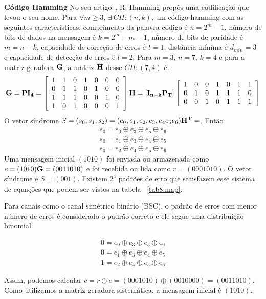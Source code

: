 \begin{example} {\bf Código Hamming} \label{CodHamm} 
No seu artigo~\cite{Hamming:1950}, R. Hamming propôs uma codificação que levou o seu nome. Para $\forall m \geq 3$, $\exists\ CH:(n,k)$, um código hamming com as seguintes características: comprimento da palavra código é $n=2^m -1$, número de bits de dados na mensagem é $k=2^m-m-1$, número de bits de paridade é $m=n-k$, capacidade de correção de erros é $t=1$, distância mínima é $d_{min} = 3$ e capacidade de detecção de erros é $l=2$. Para $m=3$, $n=7$, $k=4$ e para a matriz geradora ${\bf G}$, a matriz ${\bf H}$ desse $CH:(7,4)$ é:
\begin{align*}
{\bf G} = {\bf PI_4} = \left[\begin{array}{ccccccc}
1 & 1 & 0 & 1 & 0 & 0 & 0\\
0 & 1 & 1 & 0 & 1 & 0 & 0\\
1 & 1 & 1 & 0 & 0 & 1 & 0\\
1 & 0 & 1 & 0 & 0 & 0 & 1
\end{array}\right]
{\bf H} = \left[ {\bf I_{n-k}P_T} \right] \left[\begin{array}{ccccccc}
1 & 0 & 0 & 1 & 0 & 1 & 1\\
0 & 1 & 0 & 1 & 1 & 1 & 0\\
0 & 0 & 1 & 0 & 1 & 1 & 1
\end{array}\right]
\end{align*}
O vetor síndrome $S=(s_0, s_1, s_2)= (e_0, e_1, e_2, e_3, e_4 e_5 e_6){\bf H^T}=$. Então
\begin{align*}
s_0=e_0 \oplus e_3 \oplus e_5 \oplus e_6\\
s_0=e_1 \oplus e_3 \oplus e_4 \oplus e_5\\
s_0=e_2 \oplus e_4 \oplus e_5 \oplus e_6
\end{align*}
Uma mensagem inicial $(1010)$ foi enviada ou armazenada como $c=(1010){\bf G}=(0011010)$ e foi recebida ou lida como $r=(0001010)$. O vetor síndrome é $S=(001)$. Existem $2^4$ padrões de erro que satisfazem esse sistema de equações que podem ser vistos na tabela ~\ref{tab8:map}.



Para canais como o canal simétrico binário (BSC), o padrão de erros com menor número de erros é considerado o padrão correto e ele segue uma distribuição binomial.

\begin{align*}
0=e_0 \oplus e_3 \oplus e_5 \oplus e_6\\
0=e_1 \oplus e_3 \oplus e_4 \oplus e_5\\
1=e_2 \oplus e_4 \oplus e_5 \oplus e_6
\end{align*}

Assim, podemos calcular $c=r \oplus e= (0001010) \oplus (0010000)=(0011010)$. Como utilizamos a matriz geradora sistemática, a mensagem inicial é $(1010)$.

\end{example}

